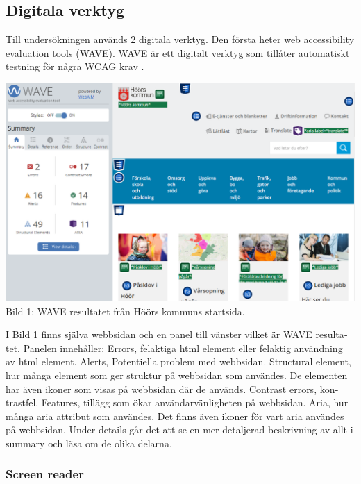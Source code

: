 \documentclass[11p]{article}
\begin{document}
\begin{otherlanguage}{swedish}
    \subsection{Digitala verktyg}
    Till undersökningen används 2 digitala verktyg.
    Den första heter web accessibility evaluation tools (WAVE).
    WAVE är ett digitalt verktyg som tillåter automatiskt testning för några WCAG krav \parencite{WAVE}.
    \newpage
    \begin{center}
    \includegraphics[width=1\textwidth]{../images/höörsKommunhemsida_WAVE.png} %
    Bild 1: WAVE resultatet från Höörs kommuns startsida.
    \end{center}
    I Bild 1 finns själva webbsidan och en panel till vänster vilket är WAVE resultatet.
    Panelen innehåller:
    Errors, felaktiga html element eller felaktig användning av html element.
    Alerts, Potentiella problem med webbsidan.
    Structural element, hur många element som ger struktur på webbsidan som användes.
    De elementen har även ikoner som visas på webbsidan där de används.
    Contrast errors, kontrastfel.
    Features, tillägg som ökar användarvänligheten på webbsidan.
    Aria, hur många aria attribut som användes.
    Det finns även ikoner för vart aria användes på webbsidan.
    Under details går det att se en mer detaljerad beskrivning av allt i summary och läsa om de olika delarna.


    \subsubsection{Screen reader} %


\end{otherlanguage}
\end{document}
